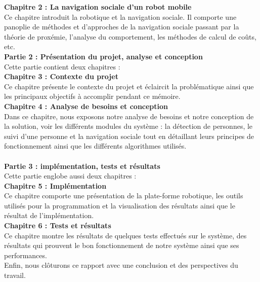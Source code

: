 \textbf{Chapitre 2 : La navigation sociale d’un robot mobile}\vspace{5px}\\
\tab Ce chapitre introduit la robotique et la navigation sociale. Il comporte une panoplie de méthodes et d'approches de la navigation sociale passant par la théorie de proxémie, l'analyse du comportement, les méthodes de calcul de coûts, etc.\vspace{5px}\\
{\Large \textbf{Partie 2 : Présentation du projet, analyse et conception}} \\
\tab Cette partie contient deux chapitres :\vspace{5px}\\
\textbf{Chapitre 3 : Contexte du projet} \vspace{5px}\\
\tab Ce chapitre présente le contexte du projet et éclaircit la problématique ainsi que les principaux  objectifs à accomplir pendant ce  mémoire. \vspace{5px}\\
\textbf{Chapitre 4 : Analyse de besoins et conception}\vspace{5px}\\
\tab  Dans ce chapitre, nous exposons notre analyse de besoins et notre conception de la solution, voir les différents modules du système : la détection de personnes, le suivi d'une personne et la navigation sociale tout en détaillant leurs principes de fonctionnement ainsi que les différents algorithmes utilisés.\vspace{5px}\\ \\
{\Large \textbf{Partie 3 : implémentation, tests et résultats}}\vspace{5px}\\ 
\tab Cette partie englobe  aussi deux chapitres :\vspace{5px}\\
\textbf{Chapitre 5 : Implémentation}\vspace{5px}\\ 
\tab Ce chapitre comporte une présentation de la plate-forme robotique, les outils utilisés pour la programmation et la visualisation des résultats ainsi que le résultat de l'implémentation. \vspace{5px}\\
\textbf{Chapitre 6 : Tests et résultats}\vspace{5px}\\ 
\tab Ce chapitre montre les résultats de quelques tests effectués sur le système, des résultats qui prouvent le bon fonctionnement de notre système ainsi que ses performances. \vspace{5px}\\
\tab Enfin, nous clôturons ce rapport avec une conclusion et des perspectives du travail. 

